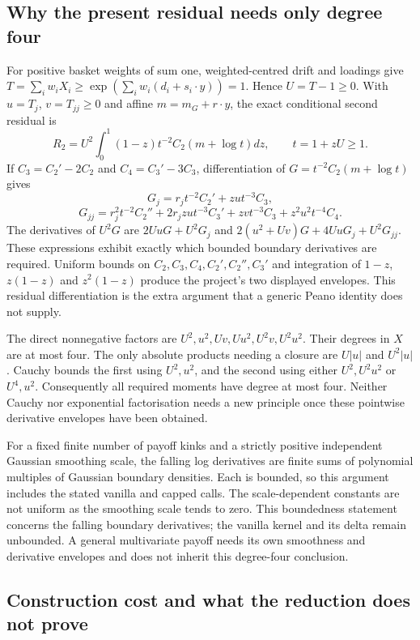 \subsection{Why the present residual needs only degree four}

For positive basket weights of sum one, weighted-centred drift and
loadings give
$T=\sum_iw_iX_i\geq\exp(\sum_iw_i(d_i+s_i\cdot y))=1$.
Hence $U=T-1\geq0$. With $u=T_j$, $v=T_{jj}\geq0$ and affine
$m=m_G+r\cdot y$, the exact conditional second residual is
\[
 R_2=U^2\int_0^1(1-z)t^{-2}C_2(m+\log t)dz,
 \qquad t=1+zU\geq1.
\]
If $C_3=C_2'-2C_2$ and $C_4=C_3'-3C_3$, differentiation of
$G=t^{-2}C_2(m+\log t)$ gives
\[
 G_j=r_jt^{-2}C_2'+zu t^{-3}C_3,
\]
\[
 G_{jj}=r_j^2t^{-2}C_2''+2r_jzu t^{-3}C_3'
                         +zv t^{-3}C_3+z^2u^2t^{-4}C_4.
\]
The derivatives of $U^2G$ are $2UuG+U^2G_j$ and
$2(u^2+Uv)G+4UuG_j+U^2G_{jj}$. These expressions exhibit exactly
which bounded boundary derivatives are required. Uniform bounds on
$C_2,C_3,C_4,C_2',C_2'',C_3'$ and integration of $1-z$,
$z(1-z)$ and $z^2(1-z)$ produce the project's two displayed
envelopes. This residual differentiation is the extra argument that a
generic Peano identity does not supply.

The direct nonnegative factors are
$U^2,u^2,Uv,Uu^2,U^2v,U^2u^2$. Their degrees in $X$ are at most
four. The only absolute products needing a closure are $U|u|$ and
$U^2|u|$. Cauchy bounds the first using $U^2,u^2$, and the second
using either $U^2,U^2u^2$ or $U^4,u^2$. Consequently all required
moments have degree at most four. Neither Cauchy nor exponential
factorisation needs a new principle once these pointwise derivative
envelopes have been obtained.

For a fixed finite number of payoff kinks and a strictly positive
independent Gaussian smoothing scale, the falling log derivatives are
finite sums of polynomial multiples of Gaussian boundary densities.
Each is bounded, so this argument includes the stated vanilla and
capped calls. The scale-dependent constants are not uniform as the
smoothing scale tends to zero. This boundedness statement concerns the
falling boundary derivatives; the vanilla kernel and its delta remain
unbounded. A general multivariate payoff needs its own smoothness and
derivative envelopes and does not inherit this degree-four conclusion.

\subsection{Construction cost and what the reduction does not prove}

